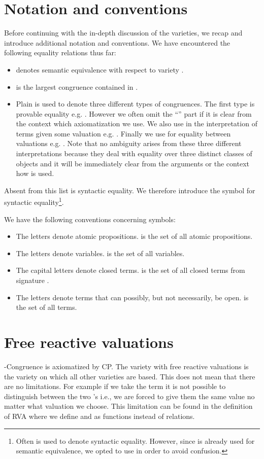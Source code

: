 \documentclass[a4paper,twoside,openright]{report}
\begin{document}
\section{Notation and conventions}
Before continuing with the in-depth discussion of the varieties, we recap and introduce additional notation and conventions. We have encountered the following equality relations thus far:
\begin{itemize}
\item  denotes semantic equivalence with respect to variety .
\item  is the largest congruence contained in .
\item Plain  is used to denote three different types of congruences. The first type is provable equality e.g. . However we often omit the ``'' part if it is clear from the context which axiomatization we use. We also use  in the interpretation of terms given some valuation  e.g. . Finally we use  for equality between valuations e.g. . Note that no ambiguity arises from these three different interpretations because they deal with equality over three distinct classes of objects and it will be immediately clear from the arguments or the context how  is used.
\end{itemize}
Absent from this list is syntactic equality. We therefore introduce the symbol  for syntactic equality\footnote{Often  is used to denote syntactic equality. However, since  is already used for semantic equivalence, we opted to use  in order to avoid confusion.}.

We have the following conventions concerning symbols:
\begin{itemize}
\item The letters  denote atomic propositions.  is the set of all atomic propositions.
\item The letters  denote variables.  is the set of all variables.
\item The capital letters  denote closed terms.  is the set of all closed terms from signature .
\item The letters  denote terms that can possibly, but not necessarily, be open.  is the set of all terms.
\end{itemize}

\section{Free reactive valuations}
-Congruence is axiomatized by CP. The variety with free reactive valuations is the variety on which all other varieties are based. This does not mean that there are no limitations. For example if we take the term  it is not possible to distinguish between the two 's i.e., we are forced to give them the same value no matter what valuation we choose. This limitation can be found in the definition of RVA where we define  and  as functions instead of relations.
\end{document}
